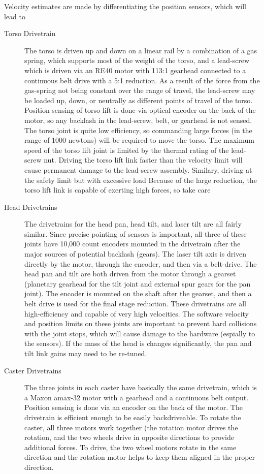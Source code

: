 Velocity estimates are made by differentiating the position sensors, which will lead to 

\begin{description}
\item[Torso Drivetrain]
The torso is driven up and down on a linear rail by a combination of a gas spring, which supports most of the weight of the torso, and a lead-screw which is driven via an RE40 motor with 113:1 gearhead connected to a continuous belt drive with a  5:1 reduction.  As a result of the force from the gas-spring not being constant over the range of travel, the lead-screw may be loaded up, down, or neutrally as different points of travel of the torso.  Position sensing of torso lift is done via optical encoder on the back of the motor, so any backlash in the lead-screw, belt, or gearhead is not sensed.  The torso joint is quite low efficiency, so commanding large forces (in the range of 1000 newtons) will be required to move the torso.  The maximum speed of the torso lift joint is limited by the thermal rating of the lead-screw nut.  Driving the torso lift link faster than the velocity limit will cause permanent damage to the lead-screw assembly.  Similary, driving at the safety limit but with excessive load
Because of the large reduction, the torso lift link is capable of exerting high forces, so take care

\item[Head Drivetrains]
The drivetrains for the head pan, head tilt, and laser tilt are all fairly similar.  Since precise pointing of sensors is important, all three of these joints have 10,000 count encoders mounted in the drivetrain after the major sources of potential backlash (gears).  The laser tilt axis is driven directly by the motor, through the encoder, and then via a belt-drive.  The head pan and tilt are both driven from the motor through a gearset (planetary gearhead for the tilt joint and external spur gears for the pan joint).  The encoder is mounted on the shaft after the gearset, and then a belt drive is used for the final stage reduction.  These drivetrains are all high-efficiency and capable of very high velocities.  The software velocity and position limits on these joints are important to prevent hard collisions with the joint stops, which will cause damage to the hardware (espially to the sensors).  If the mass of the head is changes significantly, the pan and tilt link gains may need to be re-tuned.

\item[Caster Drivetrains]
The three joints in each caster have basically the same drivetrain, which is a Maxon amax-32 motor with a gearhead and a continuous belt output.  Position sensing is done via an encoder on the back of the motor.  The drivetrain is efficient enough to be easily backdriveable.  To rotate the caster, all three motors work together (the rotation motor drives the rotation, and the two wheels drive in opposite directions to provide additional forces.  To drive, the two wheel motors rotate in the same direction and the rotation motor helps to keep them aligned in the proper direction.


\end{description}
